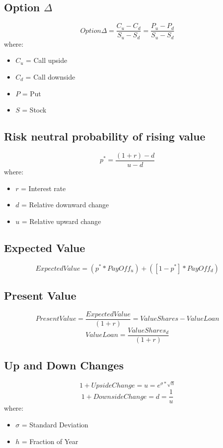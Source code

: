 \documentclass{cheatsheet}
\begin{document}
\subsection{Option $\Delta$}
\[Option \Delta = \frac{C_u - C_d}{S_u - S_d} = \frac{P_u - P_d}{S_u - S_d}\]
\noindent where:
\begin{itemize}
  \item $C_u$ = Call upside
  \item $C_d$ = Call downside
  \item $P$ = Put
  \item $S$ = Stock
\end{itemize}
\subsection{Risk neutral probability of rising value}
\[p^{*} = \frac{(1+r) - d}{u-d}\]
\noindent where:
\begin{itemize}
  \item $r$ = Interest rate
  \item $d$ = Relative downward change
  \item $u$ = Relative upward change
\end{itemize}
\subsection{Expected Value}
\[Expected Value = (p^{*} * PayOff_u) + ([1 - p^{*}] * PayOff_d)\]
\subsection{Present Value}
\[Present Value = \frac{Expected Value}{(1+r)} = ValueShares - ValueLoan\]
\[Value Loan = \frac{ValueShares_d}{(1+r)}\]
\subsection{Up and Down Changes}
\[1 + UpsideChange = u = e^{\sigma*\sqrt{h}}\]
\[1 + DownsideChange = d = \frac{1}{u}\]
\noindent where:
\begin{itemize}
  \item $\sigma$ = Standard Deviation
  \item $h$ = Fraction of Year
\end{itemize}
\end{document}
